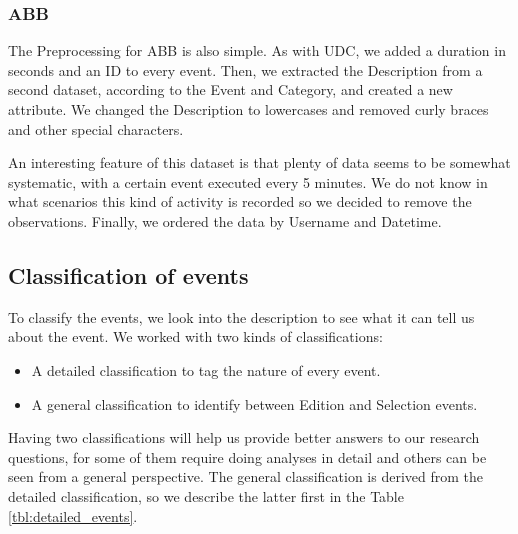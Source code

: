 \subsubsection{ABB}
The Preprocessing for ABB is also simple. As with UDC, we added a duration in seconds and an ID to every event. Then, we extracted the Description from a second dataset, according to the Event and Category, and created a new attribute. We changed the Description to lowercases and removed curly braces and other special characters. 

An interesting feature of this dataset is that plenty of data seems to be somewhat systematic, with a certain event executed every 5 minutes. We do not know in what scenarios this kind of activity is recorded so we decided to remove the observations. Finally, we ordered the data by Username and Datetime.

\subsection{Classification of events}
To classify the events, we look into the description to see what it can tell us about the event. We worked with two kinds of classifications:
\begin{itemize}
	\item A detailed classification to tag the nature of every event.
	\item A general classification to identify between Edition and Selection events.
\end{itemize}
Having two classifications will help us provide better answers to our research questions, for some of them require doing analyses in detail and others can be seen from a general perspective. The general classification is derived from the detailed classification, so we describe the latter first in the Table \ref{tbl:detailed_events}.

